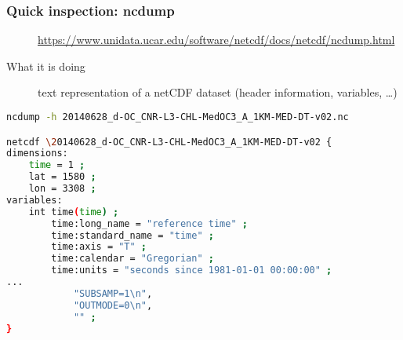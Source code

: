 \begin{frame}[c, fragile]
\frametitle{Quick inspection: ncdump}

\begin{description}
\item[\homepage] {\scriptsize \url{https://www.unidata.ucar.edu/software/netcdf/docs/netcdf/ncdump.html}}
\item[What it is doing] text representation of a netCDF dataset (header information, variables, \ldots)
\end{description}

\vfill

\begin{lstlisting}[language=bash,basicstyle=\tiny,title={ncdump applied on a file}]
ncdump -h 20140628_d-OC_CNR-L3-CHL-MedOC3_A_1KM-MED-DT-v02.nc

netcdf \20140628_d-OC_CNR-L3-CHL-MedOC3_A_1KM-MED-DT-v02 {
dimensions:
	time = 1 ;
	lat = 1580 ;
	lon = 3308 ;
variables:
	int time(time) ;
		time:long_name = "reference time" ;
		time:standard_name = "time" ;
		time:axis = "T" ;
		time:calendar = "Gregorian" ;
		time:units = "seconds since 1981-01-01 00:00:00" ;
...
			"SUBSAMP=1\n",
			"OUTMODE=0\n",
			"" ;
}

\end{lstlisting}

\end{frame}

